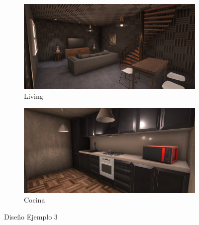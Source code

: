\begin{figure}
     \centering
     \begin{subfigure}[b]{0.5\textwidth}
         \centering
         \includegraphics[width=\textwidth]{figs/3_1.png}
         \caption{Living}
         \label{1_1}
     \end{subfigure}
     \hfill
     \begin{subfigure}[b]{0.5\textwidth}
         \centering
         \includegraphics[width=\textwidth]{figs/3_2.png}
         \caption{Cocina}
         \label{1_2}
     \end{subfigure}
     \hfill
        \caption{Diseño Ejemplo 3}
        \label{diseno_3}
\end{figure}

